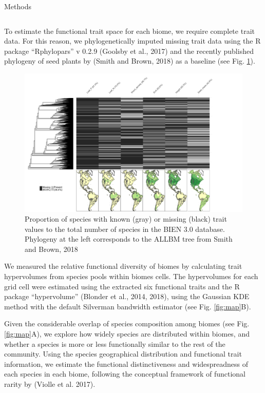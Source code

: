 \documentclass[final]{beamer}
\newlength{\onecolwid}
\begin{document}
\begin{frame}[t]
\begin{columns}[t]
\begin{column}{\onecolwid}
\begin{alertblock}{Methods}
\begin{tabular}{cp{}cp{}}
\end{tabular}

\hfill

 To estimate the functional trait space for each biome, we require complete trait data. For this reason, we phylogenetically imputed missing trait data using the R package ``Rphylopars'' v 0.2.9 (Goolsby et al., 2017) and the recently published phylogeny of seed plants by (Smith and Brown, 2018) as a baseline (see Fig. \ref{fig:sampling}).



\begin{figure}[h]
	\centering
	\includegraphics[width=\textwidth]{./figures/Trait_sampling}
	\caption{Proportion of species with known (gray) or missing (black) trait values to the total number of species in the BIEN 3.0 database. Phylogeny at the left corresponds to the ALLBM tree from Smith and Brown, 2018}
	\label{fig:sampling}
\end{figure}

We measured the relative functional diversity of biomes by calculating trait hypervolumes from species pools within biomes cells. The hypervolumes for each grid cell were estimated using the extracted six functional traits and the R package ``hypervolume'' (Blonder et al., 2014, 2018), using the Gaussian KDE method with the default Silverman bandwidth estimator (see Fig. \ref{fig:map}B). 

Given the considerable overlap of species composition among biomes (see Fig. \ref{fig:map}A), we explore how widely species are distributed within biomes, and whether a species is more or less functionally similar to the rest of the community. Using the species geographical distribution and functional trait information, we estimate the functional distinctiveness and widespreadness of each species in each biome, following the conceptual framework of functional rarity by (Violle et al. 2017).


\end{alertblock}
\end{column}
\end{columns}
\end{frame}
\end{document}
